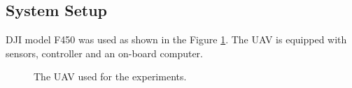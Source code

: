 \documentclass[12pt]{report}
\begin{document}
\subsection{System Setup}
DJI model F450 \cite{djiframe} was used as shown in the Figure \ref{fig:dji_frame}. The UAV is equipped with sensors, controller and an on-board computer.

\begin{figure}[H]
	\centering 
	\caption{The UAV used for the experiments.}
   \label{fig:dji_frame}
\end{figure}
\end{document}

